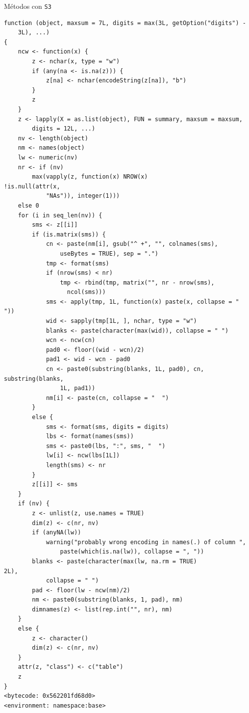 \documentclass[xcolor={usenames,svgnames,dvipsnames}]{beamer}
\begin{document}
\begin{frame}[label={sec:orga0641c5},fragile]{Métodos con \texttt{S3}}
\begin{verbatim}
function (object, maxsum = 7L, digits = max(3L, getOption("digits") - 
    3L), ...) 
{
    ncw <- function(x) {
        z <- nchar(x, type = "w")
        if (any(na <- is.na(z))) {
            z[na] <- nchar(encodeString(z[na]), "b")
        }
        z
    }
    z <- lapply(X = as.list(object), FUN = summary, maxsum = maxsum, 
        digits = 12L, ...)
    nv <- length(object)
    nm <- names(object)
    lw <- numeric(nv)
    nr <- if (nv) 
        max(vapply(z, function(x) NROW(x)
!is.null(attr(x, 
            "NAs")), integer(1)))
    else 0
    for (i in seq_len(nv)) {
        sms <- z[[i]]
        if (is.matrix(sms)) {
            cn <- paste(nm[i], gsub("^ +", "", colnames(sms), 
                useBytes = TRUE), sep = ".")
            tmp <- format(sms)
            if (nrow(sms) < nr) 
                tmp <- rbind(tmp, matrix("", nr - nrow(sms), 
                  ncol(sms)))
            sms <- apply(tmp, 1L, function(x) paste(x, collapse = "  "))
            wid <- sapply(tmp[1L, ], nchar, type = "w")
            blanks <- paste(character(max(wid)), collapse = " ")
            wcn <- ncw(cn)
            pad0 <- floor((wid - wcn)/2)
            pad1 <- wid - wcn - pad0
            cn <- paste0(substring(blanks, 1L, pad0), cn, substring(blanks, 
                1L, pad1))
            nm[i] <- paste(cn, collapse = "  ")
        }
        else {
            sms <- format(sms, digits = digits)
            lbs <- format(names(sms))
            sms <- paste0(lbs, ":", sms, "  ")
            lw[i] <- ncw(lbs[1L])
            length(sms) <- nr
        }
        z[[i]] <- sms
    }
    if (nv) {
        z <- unlist(z, use.names = TRUE)
        dim(z) <- c(nr, nv)
        if (anyNA(lw)) 
            warning("probably wrong encoding in names(.) of column ", 
                paste(which(is.na(lw)), collapse = ", "))
        blanks <- paste(character(max(lw, na.rm = TRUE)
2L), 
            collapse = " ")
        pad <- floor(lw - ncw(nm)/2)
        nm <- paste0(substring(blanks, 1, pad), nm)
        dimnames(z) <- list(rep.int("", nr), nm)
    }
    else {
        z <- character()
        dim(z) <- c(nr, nv)
    }
    attr(z, "class") <- c("table")
    z
}
<bytecode: 0x562201fd68d0>
<environment: namespace:base>
\end{verbatim}
\end{frame}
\end{document}
